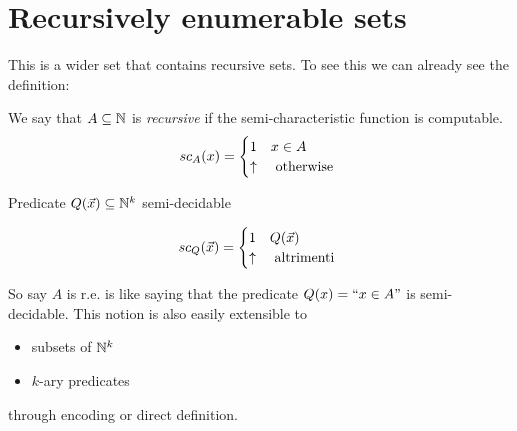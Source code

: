 \chapter{Recursively enumerable sets}
This is a wider set that contains recursive sets. To see this we can
already see the definition:

\begin{definition}
  We say that $ A \subseteq \mathbb{N} $ is \emph{recursive} if
  the semi-characteristic function is computable.
  \begin{equation*}
    sc_A(x) = \begin{cases} 1 & x \in A \\ \uparrow & $
      otherwise $
    \end{cases}
  \end{equation*}

  Predicate $ Q(\vec{x}) \subseteq \mathbb{N}^k $ semi-decidable

  \begin{equation*} sc_Q(\vec{x}) = \begin{cases} 1 & Q(\vec{x}) \\
      \uparrow & $ altrimenti $
    \end{cases}
  \end{equation*}
\end{definition}

So say $A$ is r.e. is like saying that the predicate $ Q(x)=``x \in A"
$ is semi-decidable. This notion is also easily extensible to
\begin{itemize}
\item subsets of $\mathbb{N}^k$
\item $k$-ary predicates
\end{itemize}
through encoding or direct definition.

